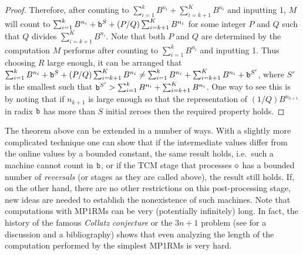 \documentclass[12pt]{article}
\begin{document}
\begin{proof}
Therefore, after counting to $\sum_{i=1}^kB^{n_i}+\sum_{i=k+1}^{K}B^{n_i}$
and inputting 1, $M$ will count to
$\sum_{i=1}^kB^{n_i}+{\tt b}^S+(P/Q)\sum_{i=k+1}^{K}B^{n_i}$ for some integer
$P$ and $Q$ such that $Q$ divides $\sum_{i=k+1}^{K}B^{n_i}$. Note that
both $P$ and $Q$ are determined by the computation $M$ performs after
counting to $\sum_{i=1}^kB^{n_i}$ and inputting 1. Thus choosing
$R$ large enough, it can be arranged that
$\sum_{i=1}^kB^{n_i}+{\tt b}^S+(P/Q)\sum_{i=k+1}^{K}B^{n_i}\not=
\sum_{i=1}^kB^{n_i}+\sum_{i=k+1}^{K}B^{n_i}+{\tt b}^{S'}$, where $S'$ is the
smallest such that ${\tt b}^{S'}>
\sum_{i=1}^kB^{n_i}+\sum_{i=k+1}^{K}B^{n_i}$. One way to see this is by
noting that if $n_{k+1}$ is large enough so that the representation of
$(1/Q)B^{n_{k+1}}$ in radix ${\tt b}$ has more than $S$ initial zeroes then the
required property holds. 
\end{proof}

The theorem above can be extended in a number of ways. With a slightly
more complicated technique one can show that if the intermediate
values differ from the online values by a bounded constant, the same
result holds, i.e.~such a machine cannot count in ${\tt b}$, or if the
TCM stage that processes $\diamond$ has a bounded number of {\it
  reversals\/} (or stages as they are called above), the result still
holds. If, on the other hand, there are no other restrictions on this
post-processing stage, new ideas are needed to establish the
nonexistence of such machines. Note that computations
with MP1RMs can be very (potentially infinitely) long. In fact, the history
of the famous {\it Collatz conjecture\/} or the $3n+1$ problem (see
\cite{Leht} for a discussion and a bibliography) shows that
even analyzing the length of the computation performed by the simplest
MP1RMs is very hard.
\end{document}

